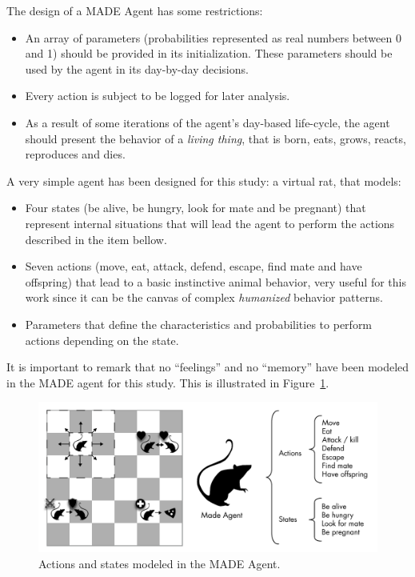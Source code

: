 \documentclass[letterpaper]{article}
\begin{document}
The design of a MADE Agent has some restrictions:
\begin{itemize}
\item An array of parameters (probabilities represented as real numbers between 0 and 1) should be provided in its initialization. These parameters should be used by the agent in its day-by-day decisions.
\item Every action is subject to be logged for later analysis.
\item As a result of some iterations of the agent's day-based life-cycle, the agent should present the behavior of a \textit{living thing}, that is born, eats, grows, reacts, reproduces and dies.  
\end{itemize}

A very simple agent has been designed for this study: a virtual
rat, that models:
\begin{itemize}
\item Four states (be alive, be hungry, look for
mate and be pregnant) that represent internal situations that will lead the
agent to perform the actions described in the item bellow.
\item Seven actions (move, eat, attack, defend, escape,
find mate and have offspring) that lead to a basic instinctive animal
behavior, very useful for this work since it can be the canvas of 
complex \textit{humanized} behavior patterns.
\item Parameters that define the characteristics and probabilities to
perform actions depending on the state.
\end{itemize}
It is important to remark that no ``feelings'' and no ``memory''
have been modeled in the MADE agent for this study. This is
illustrated in Figure~\ref{fig:madeAgent}.

\begin{figure}
\begin{center}
\includegraphics[scale=0.5]{img/MadeAgent.pdf}
\caption{Actions and states modeled in the MADE Agent.}
\label{fig:madeAgent}
\end{center}
\end{figure}
\end{document}
